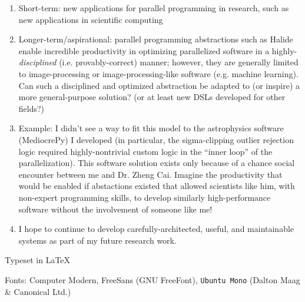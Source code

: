 \documentclass[11pt]{article}
\begin{document}
\begin{enumerate}
\item Short-term: new applications for parallel programming in
  research, such as new applications in scientific computing
\item Longer-term/aspirational: parallel programming abstractions such
  as Halide enable incredible productivity in optimizing parallelized
  software in a highly-\textit{disciplined} (i.e. provably-correct)
  manner; however, they are generally limited to image-processing or
  image-processing-like software (e.g. machine learning). Can such a
  disciplined and optimized abstraction be adapted to (or inspire) a
  more general-purpose solution? (or at least new DSLs developed for
  other fields?)
\item Example: I didn't see a way to fit this model to the
  astrophysics software (MediocrePy) I developed (in particular, the
  sigma-clipping outlier rejection logic required highly-nontrivial
  custom logic in the ``inner loop'' of the parallelization). This
  software solution exists only because of a chance social encounter
  between me and Dr. Zheng Cai. Imagine the productivity that would be
  enabled if abstactions existed that allowed scientists like him,
  with non-expert programming skills, to develop similarly
  high-performance software without the involvement of someone like
  me!
\item I hope to continue to develop carefully-architected, useful, and
  maintainable systems as part of my future research work.
\end{enumerate}

{
\vfill
\begin{center}
\color{gray}
Typeset in \LaTeX\

Fonts: Computer Modern, \textsf{FreeSans} (GNU FreeFont),
\texttt{Ubuntu Mono} (Dalton Maag \& Canonical Ltd.)
\end{center}
}
\end{document}
